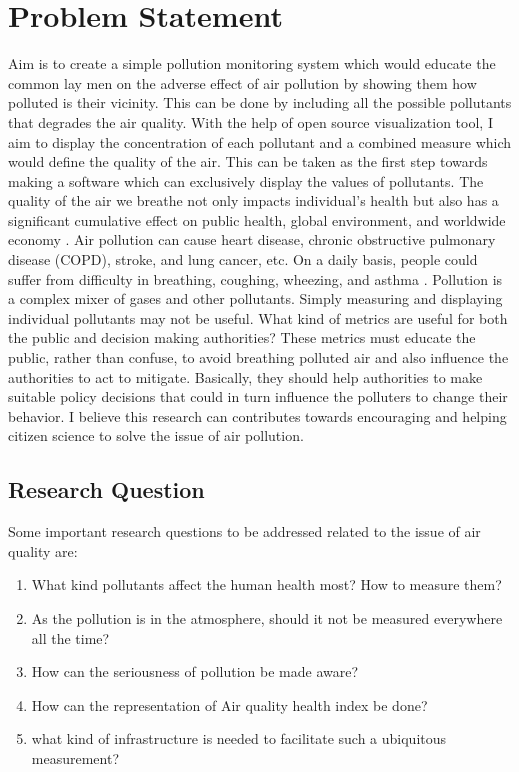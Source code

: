 \documentclass[10pt,a4paper]{report}
\begin{document}
\chapter{Problem Statement}

Aim is to create a simple pollution monitoring system which would educate the common lay men on the adverse effect of air pollution by showing them how polluted is their vicinity.  This can be done by including all the possible pollutants that degrades the air quality. With the help of open source visualization tool, I aim to display the concentration of each pollutant and a combined measure which would define the quality of the air. This can be taken as the first step towards making a software which can exclusively display the values of pollutants. The quality of the air we breathe not only impacts individual's health but also has a significant cumulative effect on public health, global environment, and worldwide economy \cite{AQI14}. Air pollution can cause heart disease, chronic obstructive pulmonary disease (COPD), stroke, and lung cancer, etc. On a daily basis, people could suffer from difficulty in breathing, coughing, wheezing, and asthma \cite{AQI14}.
 Pollution is a complex mixer of gases and other pollutants. Simply measuring and displaying individual pollutants may not be useful. What kind of metrics are useful for both the public and decision making authorities? These metrics must educate the public, rather than confuse, to avoid breathing polluted air and also influence the authorities to act to mitigate. Basically, they should help authorities to make suitable policy decisions that could in turn influence the polluters to change their behavior. I believe this research can  contributes towards encouraging and helping citizen science to solve the issue of air pollution.
 \section{Research Question}
 Some important research questions to be addressed related to the issue of air quality are: 
 \begin{enumerate}
 \item What kind pollutants affect the human health most? How to measure them?
 
  \item  As the pollution is in the atmosphere, should it not be measured everywhere all the time? 
 \item How can the seriousness of pollution be made aware?
 
 \item How can the representation of Air quality health index be done?

 \item  what kind of infrastructure is needed to facilitate such a ubiquitous measurement?
 
 \end{enumerate}
 
\end{document}
